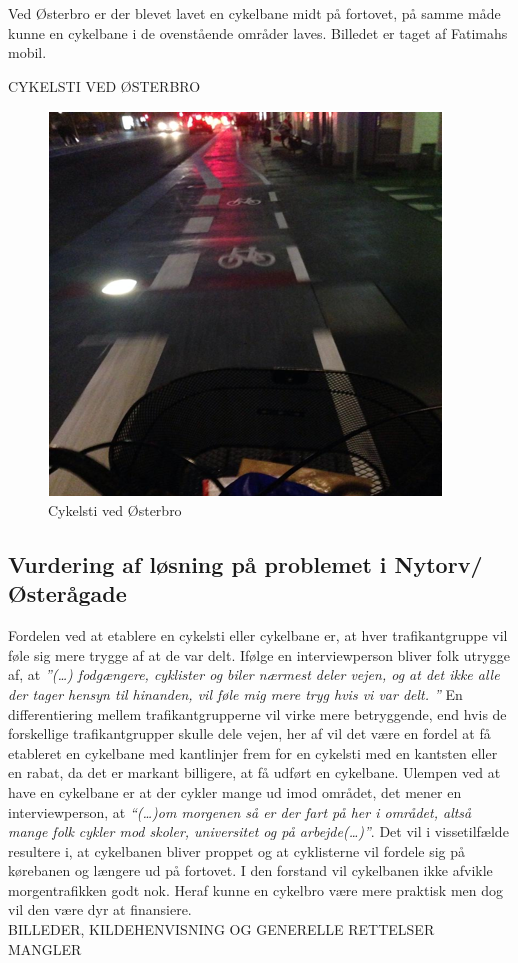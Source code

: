 Ved Østerbro er der blevet lavet en cykelbane midt på fortovet, på samme måde kunne en cykelbane i de ovenstående områder laves. Billedet er taget af Fatimahs mobil.

CYKELSTI VED ØSTERBRO
\begin{figure}[htbp]
  \centering
  \begin{adjustbox}{max width=\textwidth}
    \includegraphics{figures/Billederogfigur/osterbro.png}
 \end{adjustbox}
  \caption{Cykelsti ved Østerbro}
   \label{fig:cykelsti_ved_osterbro}
\end{figure}


\subsection{Vurdering af løsning på problemet i Nytorv/Østerågade}
Fordelen ved at etablere en cykelsti eller cykelbane er, at hver trafikantgruppe vil føle sig mere trygge af at de var delt. Ifølge en interviewperson bliver folk utrygge af, at \emph{”(…) fodgængere, cyklister og biler nærmest deler vejen, og at det ikke alle der tager hensyn til hinanden, vil føle mig mere tryg hvis vi var delt. ”} En differentiering mellem trafikantgrupperne vil virke mere betryggende, end hvis de forskellige trafikantgrupper skulle dele vejen, her af vil det være en fordel at få etableret en cykelbane med kantlinjer frem for en cykelsti med en kantsten eller en rabat, da det er markant billigere, at få udført en cykelbane. Ulempen ved at have en cykelbane er at der cykler mange ud imod området, det mener en interviewperson, at \emph{“(…)om morgenen så er der fart på her i området, altså mange folk cykler mod skoler, universitet og på arbejde(…)”}. Det vil i vissetilfælde resultere i, at cykelbanen bliver proppet og at cyklisterne vil fordele sig på kørebanen og længere ud på fortovet. I den forstand vil cykelbanen ikke afvikle morgentrafikken godt nok. Heraf kunne en cykelbro være mere praktisk men dog vil den være dyr at finansiere.
\\

BILLEDER, KILDEHENVISNING OG GENERELLE RETTELSER MANGLER
